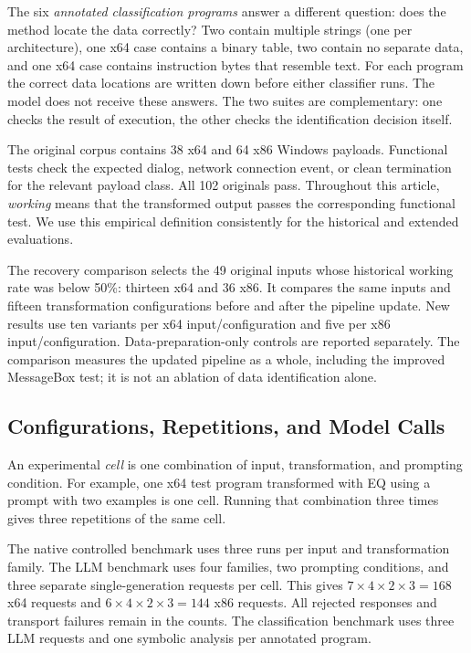 The six \emph{annotated classification programs} answer a different
question: does the method locate the data correctly? Two contain multiple
strings (one per architecture), one x64 case contains a binary table,
two contain no separate data, and one x64 case contains instruction bytes
that resemble text. For each program the correct data locations are written
down before either classifier runs. The model does not receive these answers.
The two suites are complementary: one checks the result of execution,
the other checks the identification decision itself.

The original corpus contains 38 x64 and 64 x86 Windows payloads.
Functional tests check the expected dialog, network connection event,
or clean termination for the relevant payload class. All 102 originals pass.
Throughout this article, \emph{working} means that the transformed output
passes the corresponding functional test. We use this empirical definition
consistently for the historical and extended evaluations.

The recovery comparison selects the 49 original inputs whose historical
working rate was below 50\%: thirteen x64 and 36 x86. It compares the same
inputs and fifteen transformation configurations before and after the
pipeline update. New results use ten variants per x64 input/configuration
and five per x86 input/configuration. Data-preparation-only controls are
reported separately. The comparison measures the updated pipeline as a
whole, including the improved MessageBox test; it is not an ablation of
data identification alone.

\subsection{Configurations, Repetitions, and Model Calls}
An experimental \emph{cell} is one combination of input, transformation,
and prompting condition. For example, one x64 test program transformed
with EQ using a prompt with two examples is one cell. Running that
combination three times gives three repetitions of the same cell.

The native controlled benchmark uses three runs per input and transformation
family. The LLM benchmark uses four families, two prompting conditions,
and three separate single-generation requests per cell. This gives
$7\times4\times2\times3=168$ x64 requests and
$6\times4\times2\times3=144$ x86 requests. All rejected responses and
transport failures remain in the counts. The classification benchmark uses
three LLM requests and one symbolic analysis per annotated program.

